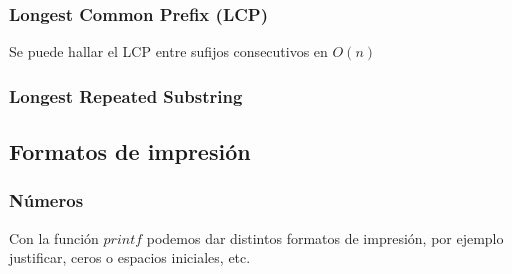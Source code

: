\documentclass[10pt,letterpaper]{article}
\newcommand{\source}[1]{
  
  \dotfill
}
\begin{document}
	\subsubsection{Longest Common Prefix (LCP)}
	Se puede hallar el LCP entre sufijos consecutivos en $O(n)$
	\source{./src/sufix-Array-Trie/SufixArrayLCP.cpp}
	
	\subsubsection{Longest Repeated Substring}
		\source{./src/sufix-Array-Trie/SufixArrayLRS.cpp}
		
		
	
		
  \subsection{Formatos de impresión}
    \subsubsection{Números}
    Con la función $printf$ podemos dar distintos formatos de impresión, por ejemplo justificar, ceros o espacios iniciales, etc.
      \source{./src/printFormat.cpp}
\end{document}
